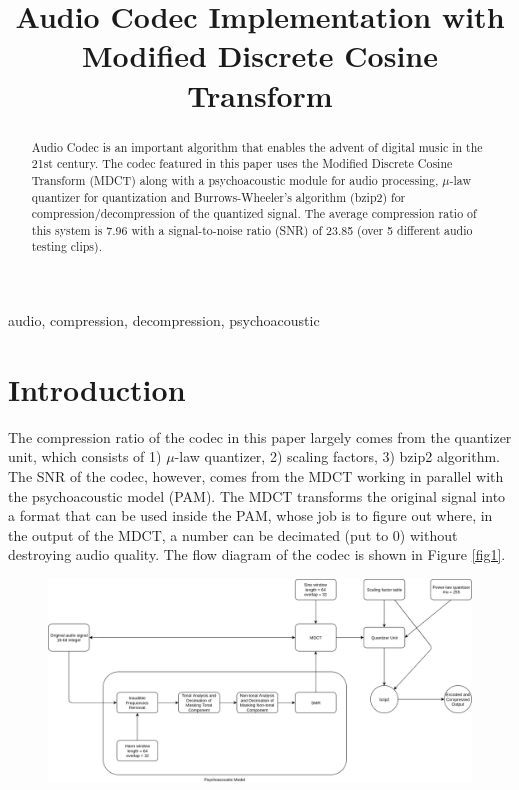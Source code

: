 \documentclass[conference]{IEEEtran}
\begin{document}
	
	\title{Audio Codec Implementation with Modified Discrete Cosine Transform
	}
	
	\author{
	}
	
	\maketitle
	
	\begin{abstract}
		Audio Codec is an important algorithm that enables the advent of digital music in the 21st century. The codec featured in this paper uses the Modified Discrete Cosine Transform (MDCT) along with a psychoacoustic module for audio processing, $\mu$-law quantizer for quantization and Burrows-Wheeler's algorithm (bzip2) for compression/decompression of the quantized signal. The average compression ratio of this system is 7.96 with a signal-to-noise ratio (SNR) of 23.85 (over 5 different audio testing clips).
	\end{abstract}
	
	\begin{IEEEkeywords}
		audio, compression, decompression, psychoacoustic
	\end{IEEEkeywords}
	
	\section{Introduction}
	The compression ratio of the codec in this paper largely comes from the quantizer unit, which consists of 1) $\mu$-law quantizer, 2) scaling factors, 3) bzip2 algorithm. The SNR of the codec, however, comes from the MDCT working in parallel with the psychoacoustic model (PAM). The MDCT transforms the original signal into a format that can be used inside the PAM, whose job is to figure out where, in the output of the MDCT, a number can be decimated (put to 0) without destroying audio quality. The flow diagram of the codec is shown in Figure \ref{fig1}.
	
	
	\begin{figure}
		\centering
		\includegraphics[width=1\linewidth]{flow_diagram_codec}
		\caption{}
		\label{fig:flowdiagramcodec}
	\end{figure}
	
\end{document}
